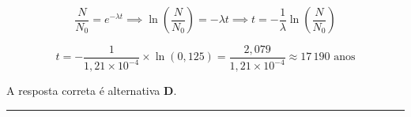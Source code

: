 \documentclass[a4paper,12pt]{article}
\newcommand{\printingbibliography}{%

    \pagestyle{myheadings}
    \markright{}
    \sloppy
    \printbibliography[heading=bibintoc, %
                   title=Refer\^encias %
                  ]
    \fussy%
}
\begin{document}
\begin{flushleft}

\[
\frac{N}{N_0} = e^{-\lambda t} \implies \ln\left(\frac{N}{N_0}\right) = -\lambda t \implies t = -\frac{1}{\lambda} \ln\left(\frac{N}{N_0}\right)
\]

\vspace{0.3cm}


\[
t = -\frac{1}{1{,}21 \times 10^{-4}} \times \ln(0{,}125) = \frac{2{,}079}{1{,}21 \times 10^{-4}} \approx 17\,190 \text{ anos}
\]

\vspace{0.3cm}


A resposta correta é alternativa \colorbox{green!50}{\textbf{D}}.
\end{flushleft}

\noindent\rule{\linewidth}{0.6pt}\\


%
%
%
%
%


\end{document}
